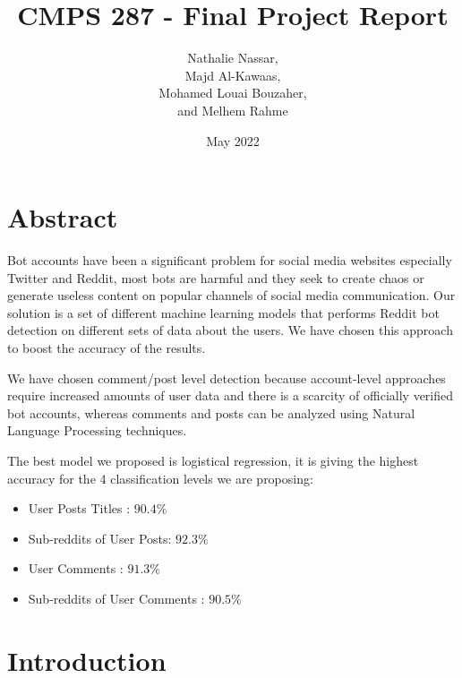 \documentclass{article}
\title{CMPS 287 - Final Project Report}
\author{Nathalie Nassar, \\Majd Al-Kawaas,\\ Mohamed Louai Bouzaher,\\ and Melhem Rahme}
\date{May 2022}
\begin{document}
\maketitle

\section{Abstract}
Bot accounts have been a significant problem for social media websites especially Twitter and Reddit, most bots are harmful and they seek to create chaos or generate useless content on popular channels of social media communication. Our solution is a set of different machine learning models that performs Reddit bot detection on different sets of data about the users. We have chosen this approach to boost the accuracy of the results. \par

We have chosen comment/post level detection because account-level approaches require increased amounts of user data and there is a scarcity of officially verified bot accounts, whereas comments and posts can be analyzed using Natural Language Processing techniques.\par

The best model we proposed is logistical regression, it is giving the highest accuracy for the 4 classification levels we are proposing: \\
\begin{itemize}
\item User Posts Titles : $90.4\%$
\item Sub-reddits of User Posts: $92.3\%$
\item User Comments : $91.3\%$
\item Sub-reddits of User Comments : $90.5\%$

\end{itemize}


\section{Introduction}
\end{document}
